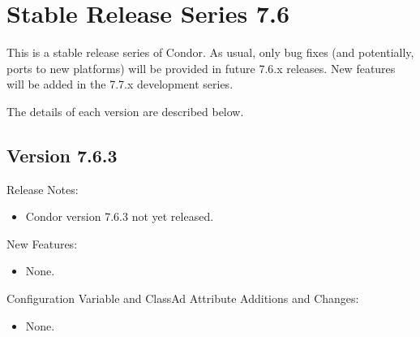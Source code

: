 
\section{\label{sec:History-7-6}Stable Release Series 7.6}

This is a stable release series of Condor.
As usual, only bug fixes (and potentially, ports to new platforms)
will be provided in future 7.6.x releases.
New features will be added in the 7.7.x development series.

The details of each version are described below.

\subsection*{\label{sec:New-7-6-3}Version 7.6.3}

\noindent Release Notes:

\begin{itemize}

\item Condor version 7.6.3 not yet released.

\end{itemize}


\noindent New Features:

\begin{itemize}

\item None.

\end{itemize}

\noindent Configuration Variable and ClassAd Attribute Additions and Changes:

\begin{itemize}

\item None.

\end{itemize}

